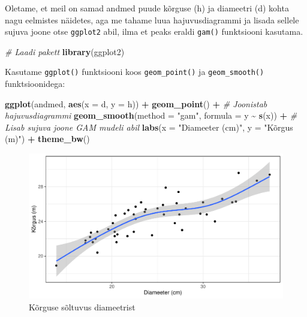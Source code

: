 \documentclass[
]{book}
\newenvironment{Shaded}{\begin{snugshade}}{\end{snugshade}}
\newcommand{\AttributeTok}[1]{\textcolor[rgb]{0.13,0.29,0.53}{#1}}
\newcommand{\CommentTok}[1]{\textcolor[rgb]{0.56,0.35,0.01}{\textit{#1}}}
\newcommand{\FunctionTok}[1]{\textcolor[rgb]{0.13,0.29,0.53}{\textbf{#1}}}
\newcommand{\NormalTok}[1]{#1}
\newcommand{\SpecialCharTok}[1]{\textcolor[rgb]{0.81,0.36,0.00}{\textbf{#1}}}
\newcommand{\StringTok}[1]{\textcolor[rgb]{0.31,0.60,0.02}{#1}}
\renewenvironment{Shaded} {\begin{snugshade}\footnotesize} {\end{snugshade}}
\theoremstyle{definition}
\theoremstyle{definition}
\theoremstyle{definition}
\theoremstyle{definition}
\theoremstyle{remark}
\begin{document}
Oletame, et meil on samad andmed puude kõrguse (h) ja diameetri (d) kohta nagu eelmistes näidetes, aga me tahame luua hajuvusdiagrammi ja lisada sellele sujuva joone otse \texttt{ggplot2} abil, ilma et peaks eraldi \texttt{gam()} funktsiooni kasutama.

\begin{Shaded}
\begin{Highlighting}[]
\CommentTok{\# Laadi pakett}
\FunctionTok{library}\NormalTok{(ggplot2)}
\end{Highlighting}
\end{Shaded}

Kasutame \texttt{ggplot()} funktsiooni koos \texttt{geom\_point()} ja \texttt{geom\_smooth()} funktsioonidega:

\begin{Shaded}
\begin{Highlighting}[]
\FunctionTok{ggplot}\NormalTok{(andmed, }\FunctionTok{aes}\NormalTok{(}\AttributeTok{x =}\NormalTok{ d, }\AttributeTok{y =}\NormalTok{ h)) }\SpecialCharTok{+}
  \FunctionTok{geom\_point}\NormalTok{() }\SpecialCharTok{+}  \CommentTok{\# Joonistab hajuvusdiagrammi}
  \FunctionTok{geom\_smooth}\NormalTok{(}\AttributeTok{method =} \StringTok{"gam"}\NormalTok{, }\AttributeTok{formula =}\NormalTok{ y }\SpecialCharTok{\textasciitilde{}} \FunctionTok{s}\NormalTok{(x)) }\SpecialCharTok{+}  \CommentTok{\# Lisab sujuva joone GAM mudeli abil}
  \FunctionTok{labs}\NormalTok{(}\AttributeTok{x =} \StringTok{"Diameeter (cm)"}\NormalTok{, }\AttributeTok{y =} \StringTok{"Kõrgus (m)"}\NormalTok{) }\SpecialCharTok{+}
  \FunctionTok{theme\_bw}\NormalTok{()}
\end{Highlighting}
\end{Shaded}

\begin{figure}[H]
\includegraphics[width=0.8\linewidth]{_main_files/figure-latex/unnamed-chunk-64-1} \caption{Kõrguse sõltuvus diameetrist}\label{fig:unnamed-chunk-64}
\end{figure}
\end{document}
